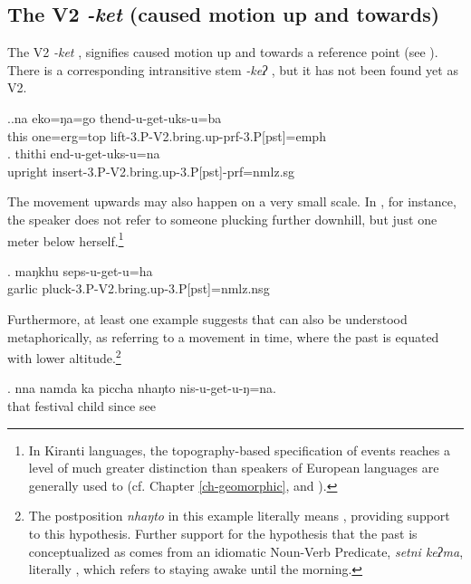 \subsection{The V2 \emph{-ket} (caused motion up and towards)}\label{V2-bringup}%

The V2 \emph{-ket}  , signifies caused motion up and towards a reference point (see \Next). There is a corresponding intransitive stem \emph{-keʔ} , but it has not been found yet as V2.  

\ex.\ag.na   eko=ŋa=go  thend-u-get-uks-u=ba\\
this one{\sc =erg=top} lift{\sc -3.P-V2.bring.up-prf-3.P[pst]=emph}\\
 
\bg. thithi end-u-get-uks-u=na\\
upright insert{\sc -3.P-V2.bring.up-3.P[pst]-prf=nmlz.sg}\\


The movement upwards may also happen on a very small scale. In \Next, for instance, the speaker does not refer to someone plucking further downhill, but just one meter below herself.\footnote{In Kiranti languages, the topography-based specification of events reaches a level of much greater distinction than speakers of European languages  are generally used to (cf. Chapter \ref{ch-geomorphic}, and  \citealt{Bickel1999Cultural, Bickel2001Deictic, Ebert1999The-up---down, Gaenszle1999Travelling}).}

\exg. maŋkhu seps-u-get-u=ha\\
garlic pluck{\sc -3.P-V2.bring.up-3.P[pst]=nmlz.nsg}\\

Furthermore, at least one example suggests that  can also be understood metaphorically, as referring to a movement in time, where the past is equated with lower altitude.\footnote{The postposition \emph{nhaŋto}  in this example literally means , providing  support to this hypothesis. Further support for the hypothesis that the past is conceptualized as  comes from an idiomatic Noun-Verb Predicate, \emph{setni keʔma}, literally , which refers to staying awake until the morning.}

\exg. nna  namda ka       piccha nhaŋto nis-u-get-u-ŋ=na.\\
that festival  child since see\\
  


